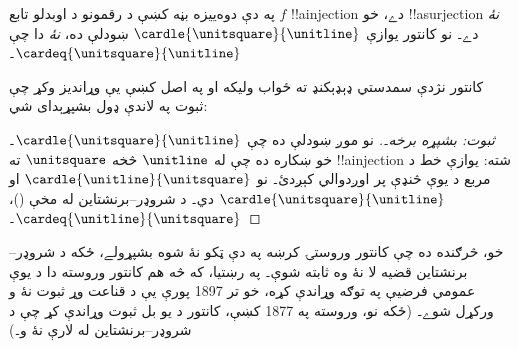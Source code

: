 \documentclass[../../../include/open-logic-section]{subfiles}
\begin{document}
په دې دوه‌ييزه بڼه کښې د رقمونو د اوبدلو تابع $f$ !!a{injection} دے، خو !!a{surjection} \emph{نۀ} دے۔ نو کانتور يوازې $\cardle{\unitsquare}{\unitline}$ ښودلې ده، \emph{نۀ} دا چې $\cardeq{\unitsquare}{\unitline}$۔

کانتور نژدې سمدستي ډېډېکنډ ته ځواب وليکه او په اصل کښې يې وړانديز وکړ چې ثبوت په لاندې ډول بشپړېدای شي:

\begin{proof}[ثبوت: بشپړه برخه۔]
نو موږ ښودلې ده چې $\cardle{\unitsquare}{\unitline}$۔ خو ښکاره ده چې له $\unitline$ څخه $\unitsquare$ ته !!a{injection} شته: يوازې خط د مربع د يوې څنډې پر اوږدوالي کېږدئ۔ نو $\cardle{\unitline}{\unitsquare}$ او $\cardle{\unitsquare}{\unitline}$ دي۔ د شروډر--برنشتاين له مخې ()، $\cardeq{\unitline}{\unitsquare}$۔
\end{proof}

خو، څرګنده ده چې کانتور وروستۍ کرښه په دې ټکو نۀ شوه بشپړولے، ځکه د شروډر--برنشتاين قضيه لا نۀ وه ثابته شوې۔ په رښتيا، که څه هم کانتور وروسته دا د يوې عمومي فرضيې په توګه وړاندې کړه، خو تر 1897 پورې يې د قناعت وړ ثبوت نۀ و ورکړل شوے۔ (ځکه نو، وروسته په 1877 کښې، کانتور د  يو بل ثبوت وړاندې کړ چې د شروډر--برنشتاين له لارې نۀ و۔)
\end{document}
